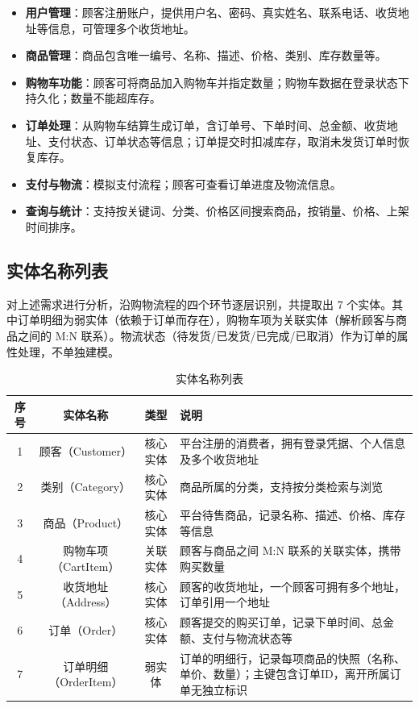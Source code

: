 \documentclass[12pt, a4paper]{academics}
\begin{document}
\begin{itemize}
    \item \textbf{用户管理}：顾客注册账户，提供用户名、密码、真实姓名、联系电话、收货地址等信息，可管理多个收货地址。
    \item \textbf{商品管理}：商品包含唯一编号、名称、描述、价格、类别、库存数量等。
    \item \textbf{购物车功能}：顾客可将商品加入购物车并指定数量；购物车数据在登录状态下持久化；数量不能超库存。
    \item \textbf{订单处理}：从购物车结算生成订单，含订单号、下单时间、总金额、收货地址、支付状态、订单状态等信息；订单提交时扣减库存，取消未发货订单时恢复库存。
    \item \textbf{支付与物流}：模拟支付流程；顾客可查看订单进度及物流信息。
    \item \textbf{查询与统计}：支持按关键词、分类、价格区间搜索商品，按销量、价格、上架时间排序。
\end{itemize}

\subsection{实体名称列表}

对上述需求进行分析，沿购物流程的四个环节逐层识别，共提取出 7 个实体。其中订单明细为弱实体（依赖于订单而存在），购物车项为关联实体（解析顾客与商品之间的 M:N 联系）。物流状态（待发货/已发货/已完成/已取消）作为订单的属性处理，不单独建模。

\begin{table}[h]
\centering
\caption{实体名称列表}
\setlength{\belowcaptionskip}{8pt}
\begin{tabular}{|c|c|c|p{6cm}|}
\hline
\textbf{序号} & \textbf{实体名称} & \textbf{类型} & \textbf{说明} \\
\hline
1 & 顾客（Customer） & 核心实体 & 平台注册的消费者，拥有登录凭据、个人信息及多个收货地址 \\
2 & 类别（Category） & 核心实体 & 商品所属的分类，支持按分类检索与浏览 \\
3 & 商品（Product） & 核心实体 & 平台待售商品，记录名称、描述、价格、库存等信息 \\
4 & 购物车项（CartItem） & 关联实体 & 顾客与商品之间 M:N 联系的关联实体，携带购买数量 \\
5 & 收货地址（Address） & 核心实体 & 顾客的收货地址，一个顾客可拥有多个地址，订单引用一个地址 \\
6 & 订单（Order） & 核心实体 & 顾客提交的购买订单，记录下单时间、总金额、支付与物流状态等 \\
7 & 订单明细（OrderItem） & 弱实体 & 订单的明细行，记录每项商品的快照（名称、单价、数量）；主键包含订单ID，离开所属订单无独立标识 \\
\hline
\end{tabular}
\end{table}
\end{document}
